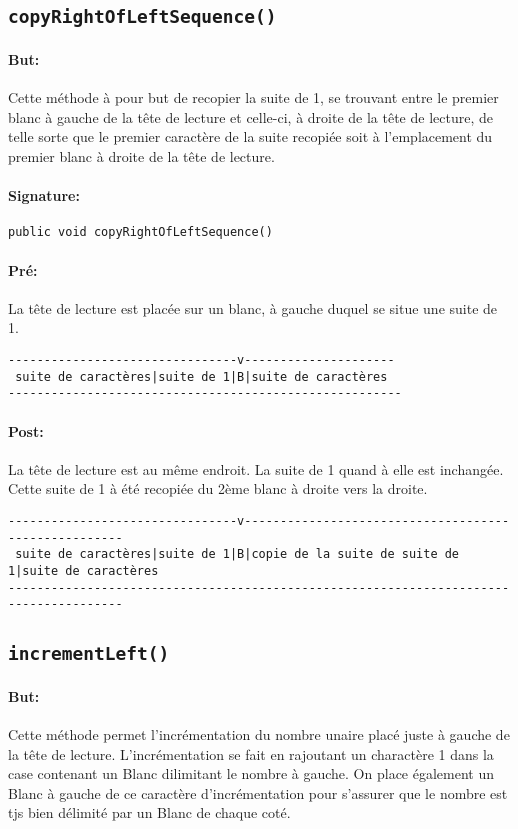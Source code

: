 \documentclass[a4paper,11pt]{article}
\begin{document}
\subsection{\texttt{copyRightOfLeftSequence()}}
\paragraph{But:} Cette méthode à pour but de recopier la suite de 1, se trouvant entre le premier blanc à gauche de la tête de lecture et celle-ci, à droite de la tête de lecture, de telle sorte que le premier caractère de la suite recopiée soit à l'emplacement du premier blanc à droite de la tête de lecture.
\paragraph{Signature:} \texttt{public void copyRightOfLeftSequence()}
\paragraph{Pré:} La tête de lecture est placée sur un blanc, à gauche duquel se situe une suite de 1.
\begin{verbatim}
--------------------------------v---------------------
 suite de caractères|suite de 1|B|suite de caractères
-------------------------------------------------------
\end{verbatim}
\paragraph{Post:} La tête de lecture est au même endroit. La suite de 1 quand à elle est inchangée. Cette suite de 1 à été recopiée du 2ème blanc à droite vers la droite.
\begin{small}
\begin{verbatim}
--------------------------------v-----------------------------------------------------
 suite de caractères|suite de 1|B|copie de la suite de suite de 1|suite de caractères
--------------------------------------------------------------------------------------
\end{verbatim}
\end{small}
\subsection{\texttt{incrementLeft()}}
\paragraph{But:} Cette méthode permet l'incrémentation du nombre unaire placé juste à gauche de la tête de lecture. L'incrémentation se fait en rajoutant un charactère 1 dans la case contenant un Blanc dilimitant le nombre à gauche. On place également un Blanc à gauche de ce caractère d'incrémentation pour s'assurer que le nombre est tjs bien délimité par un Blanc de chaque coté.
\end{document}
